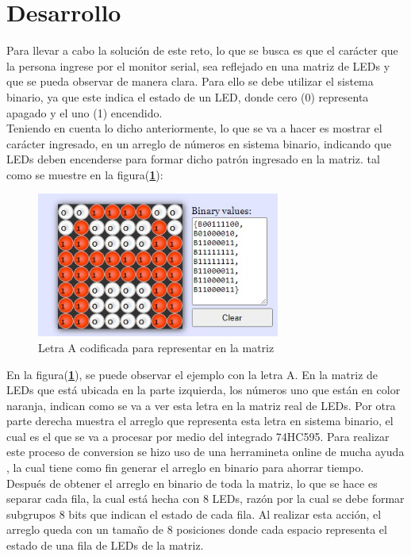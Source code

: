 \documentclass{article}
\begin{document}
\section{Desarrollo} \label{desarrollo}
Para llevar a cabo la solución de este reto, lo que se busca es que el carácter que la persona ingrese por el monitor serial, sea reflejado en una matriz de LEDs y que se pueda observar de manera clara. Para ello se debe utilizar el sistema binario, ya que este indica el estado de un LED, donde cero (0) representa apagado y el uno (1) encendido.\\

Teniendo en cuenta lo dicho anteriormente, lo que se va a hacer es mostrar el carácter ingresado, en un arreglo de números en  sistema binario, indicando que LEDs deben encenderse para formar dicho patrón ingresado en la matriz. tal como se muestre en la figura(\textbf{\ref{A}}):


    \begin{figure}[h]
    \includegraphics[width=8cm]{A.jpeg}
    \centering
    \caption{Letra A codificada para representar en la matriz}
    \label{A}
    \end{figure}

En la figura(\textbf{\ref{A}}), se puede observar el ejemplo con la letra A. En la matriz de LEDs que está ubicada en la parte izquierda, los números uno que están en color naranja, indican como se va a ver esta letra en la matriz real de LEDs. Por otra parte derecha muestra el arreglo que representa esta letra en sistema binario, el cual es el que se va a procesar por medio del integrado 74HC595. Para realizar este proceso de conversion se hizo uso de una herramineta online de mucha ayuda \cite{riyas}, la cual tiene como fin generar el arreglo en binario para ahorrar tiempo.\\

Después de obtener el arreglo en binario de toda la matriz, lo que se hace es separar cada fila, la cual está hecha con 8 LEDs, razón por la cual se debe formar subgrupos 8 bits  que indican el estado de cada fila. Al realizar esta acción, el arreglo queda con un tamaño de 8 posiciones donde cada espacio representa el estado de una fila de LEDs de la matriz. 





\end{document}
